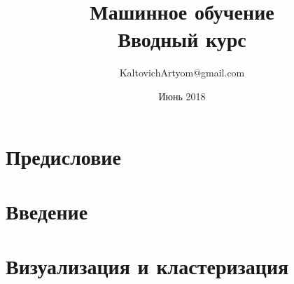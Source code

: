 \documentclass[a4paper,14pt, openany, oneside]{book}
\begin{document}
\title{\huge Машинное обучение \\ \Large Вводный курс \vspace{2cm}}
\author{\large KaltovichArtyom@gmail.com}
\date{\large Июнь 2018}
\maketitle

\tableofcontents

\chapter*{Предисловие}


\chapter*{Введение}



\chapter{Визуализация и кластеризация}



\printbibliography
\end{document}
